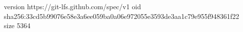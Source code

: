 version https://git-lfs.github.com/spec/v1
oid sha256:33cd5b99076e58e3a6ee059ba0a06e972055e3593de3aa1c79e955f948361f22
size 5364
